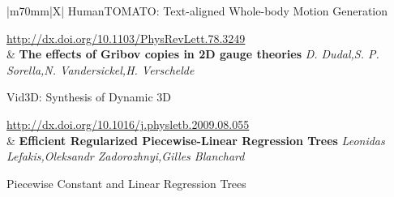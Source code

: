 \begin{longtblr}{|m{70mm}|X|}
HumanTOMATO: Text{-}aligned Whole{-}body Motion Generation

\url{http://dx.doi.org/10.1103/PhysRevLett.78.3249}\\ & \textbf{The effects of Gribov copies in 2D gauge theories} 
 \textit{D. Dudal,S. P. Sorella,N. Vandersickel,H. Verschelde} 

Vid3D: Synthesis of Dynamic 3D

\url{http://dx.doi.org/10.1016/j.physletb.2009.08.055}\\ & \textbf{Efficient Regularized Piecewise{-}Linear Regression Trees} 
 \textit{Leonidas Lefakis,Oleksandr Zadorozhnyi,Gilles Blanchard} 

Piecewise Constant and Linear Regression Trees


\end{longtblr}
